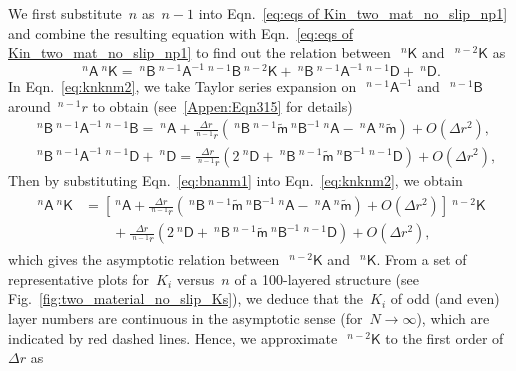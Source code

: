 \documentclass[preprint,10pt,times]{elsarticle}
\numberwithin{equation}{section}
\renewcommand{\u}[1]{\boldsymbol{#1}}
\newcommand{\usf}[1]{\u{\mathsf #1}}
\renewcommand{\>}{$\Rightarrow$}
\begin{document}
We first substitute~$n$ as~$n-1$ into Eqn.~\eqref{eq:eqs of Kin_two_mat_no_slip_np1} and combine the resulting equation with Eqn.~\eqref{eq:eqs of Kin_two_mat_no_slip_np1} to find out the relation between~$~^{n}{\usf{K}}$ and~$~^{{n-2}}{\usf{K}}$ as
\begin{equation}
	~^{n}{\usf{A}} ~^{n}{\usf{K}}  = ~^{n}{\usf{B}} ~^{{n-1}}{\usf{A}}^{-1} ~^{{n-1}}{\usf{B}} ~^{{n-2}}{\usf{K}} + ~^{n}{\usf{B}} ~^{{n-1}}{\usf{A}}^{-1} ~^{{n-1}}{\usf{D}}  + ~^{n}{\usf{D}} .
	\label{eq:knknm2}
\end{equation}
In Eqn.~\eqref{eq:knknm2}, we take Taylor series expansion on~$~^{{n-1}}{\usf{A}}^{-1}$ and~$~^{{n-1}}{\usf{B}}$ around~${}^{n-1}\!{r}$ to obtain (see~\ref{Appen:Eqn315} for details)
\begin{subequations}
	\begin{align}
	& ~^{n}{\usf{B}} ~^{{n-1}}{\usf{A}}^{-1} ~^{{n-1}}{\usf{B}} = ~^{n}{\usf{A}} + \frac{\Delta r}{~^{n-1}\!{r}} \left( ~^{n}{\usf{B}} ~^{n-1}\tilde{\usf{m}} ~^{n}{\usf{B}}^{-1} ~^{n}{\usf{A}} - ~^{n}{\usf{A}} ~^{n}\tilde{\usf{m}} \right)  + O(\Delta r^2), \\
	& ~^{n}{\usf{B}} ~^{{n-1}}{\usf{A}}^{-1} ~^{{n-1}}{\usf{D}} + ~^{n}{\usf{D}} = \frac{\Delta r}{~^{n-1}\!{r}} \left( 2~^{n}{\usf{D}} + ~^{n}{\usf{B}} ~^{n-1}\tilde{\usf{m}} ~^{n}{\usf{B}}^{-1} ~^{{n-1}}{\usf{D}} \right) + O(\Delta r^2),
	\end{align}
	\label{eq:bnanm1}
\end{subequations}
Then by substituting Eqn.~\eqref{eq:bnanm1} into Eqn.~\eqref{eq:knknm2}, we obtain
\begin{equation}
\begin{aligned}
	\begin{split}
	~^{n}{\usf{A}} ~^{n}{\usf{K}} & = \left[  ~^{n}{\usf{A}} + \frac{\Delta r}{~^{n-1}\!{r}} \left( ~^{n}{\usf{B}} ~^{n-1}\tilde{\usf{m}} ~^{n}{\usf{B}}^{-1} ~^{n}{\usf{A}} - ~^{n}{\usf{A}} ~^{n}\tilde{\usf{m}} \right)  + O(\Delta r^2) \right] ~^{{n-2}}{\usf{K}} \\
	& \qquad + \frac{\Delta r}{~^{n-1}\!{r}} \left( 2~^{n}{\usf{D}} + ~^{n}{\usf{B}} ~^{n-1}\tilde{\usf{m}} ~^{n}{\usf{B}}^{-1} ~^{{n-1}}{\usf{D}} \right) + O(\Delta r^2),
	\end{split}
\end{aligned}
\label{eq:knknm2appr1}
\end{equation}
which gives the asymptotic relation between~$~^{{n-2}}{\usf{K}}$ and~$~^{n}{\usf{K}}$.
From a set of representative plots for~$K_{i}$ versus~$n$ of a 100-layered structure (see Fig.~\ref{fig:two_material_no_slip_Ks}), we deduce that the~$K_{i}$ of odd (and even) layer numbers are continuous in the asymptotic sense (for~$N \to \infty$), which are indicated by red dashed lines. Hence, we approximate~$~^{{n-2}}{\usf{K}}$ to the first order of~$\Delta r$ as
\end{document}

